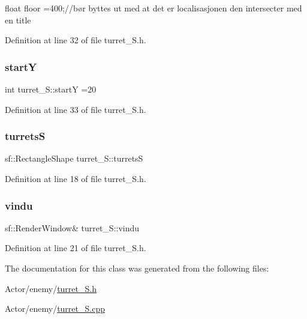 float floor =400;//bør byttes ut med at det er localisasjonen den intersecter med en title 



Definition at line 32 of file turret\+\_\+\+S.\+h.

\hypertarget{classturret___s_aca9fccc5caa87740c08e30024717b930}{}\label{classturret___s_aca9fccc5caa87740c08e30024717b930} 
\subsubsection{\texorpdfstring{startY}{startY}}
{\footnotesize\ttfamily int turret\+\_\+\+S\+::startY =20}



Definition at line 33 of file turret\+\_\+\+S.\+h.

\hypertarget{classturret___s_a91bc6f294f3277df7337758fd48a2adc}{}\label{classturret___s_a91bc6f294f3277df7337758fd48a2adc} 
\subsubsection{\texorpdfstring{turretsS}{turretsS}}
{\footnotesize\ttfamily sf\+::\+Rectangle\+Shape turret\+\_\+\+S\+::turretsS}



Definition at line 18 of file turret\+\_\+\+S.\+h.

\hypertarget{classturret___s_a5a21c67328356ed52b566e2e06a5d799}{}\label{classturret___s_a5a21c67328356ed52b566e2e06a5d799} 
\subsubsection{\texorpdfstring{vindu}{vindu}}
{\footnotesize\ttfamily sf\+::\+Render\+Window\& turret\+\_\+\+S\+::vindu}



Definition at line 21 of file turret\+\_\+\+S.\+h.



The documentation for this class was generated from the following files\+:\begin{DoxyCompactItemize}
\item 
Actor/enemy/\hyperlink{turret___s_8h}{turret\+\_\+\+S.\+h}\item 
Actor/enemy/\hyperlink{turret___s_8cpp}{turret\+\_\+\+S.\+cpp}\end{DoxyCompactItemize}

